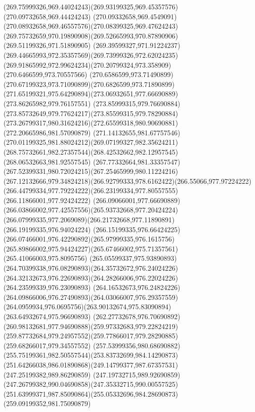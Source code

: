 {    \curveto(269.75999326,969.44024243)(269.93199325,969.45357576)(270.09732658,969.44424243)
    \curveto(270.09332658,969.4549091)(270.08932658,969.46557576)(270.08399325,969.47624243)
    \curveto(269.75732659,970.19890908)(269.52665993,970.87890906)(269.51199326,971.51890905)
    \curveto(269.39599327,971.91224237)(269.44665993,972.35357569)(269.73999326,972.62024235)
    \curveto(269.91865992,972.99624234)(270.20799324,973.358909)(270.6466599,973.70557566)
    \curveto(270.6586599,973.71490899)(270.67199323,973.71090899)(270.6826599,973.71890899)
    \curveto(271.65199321,975.64290894)(273.06932651,977.66690889)(273.86265982,979.76157551)
    \curveto(273.85999315,979.76690884)(273.85732649,979.77624217)(273.85599315,979.78290884)
    \curveto(273.26799317,980.31624216)(272.65599318,980.90690881)(272.20665986,981.57090879)
    \curveto(271.14132655,981.67757546)(270.01199325,981.88024212)(269.07199327,982.35624211)
    \curveto(268.75732661,982.27357544)(268.42532662,982.12957545)(268.06532663,981.92557545)
    \curveto(267.77332664,981.33357547)(267.52399331,980.72024215)(267.25465999,980.11224216)
    \curveto(267.12132666,979.34824218)(266.92799333,978.6162422)(266.55066,977.97224222)
    \curveto(266.44799334,977.79224222)(266.23199334,977.80557555)(266.11866001,977.92424222)
    \curveto(266.09066001,977.66690889)(266.03866002,977.42557556)(265.93732668,977.20424224)
    \curveto(266.07999335,977.2069089)(266.21732668,977.11890891)(266.19199335,976.94024224)
    \curveto(266.15199335,976.66424225)(266.07466001,976.42290892)(265.97999335,976.1615756)
    \curveto(265.89866002,975.94424227)(265.67466002,975.71357561)(265.41066003,975.8095756)
    \curveto(265.05599337,975.93890893)(264.70399338,976.08290893)(264.35732672,976.24024226)
    \curveto(264.32132673,976.22690893)(264.28266006,976.22024226)(264.23599339,976.23090893)
    \curveto(264.16532673,976.24824226)(264.09866006,976.27490893)(264.03066007,976.29357559)
    \curveto(264.0959934,976.0695756)(263.90132674,975.83090894)(263.64932674,975.96690893)
    \curveto(262.27732678,976.70690892)(260.98132681,977.94690888)(259.97332683,979.22824219)
    \curveto(259.87732684,979.24957552)(259.77866017,979.28290885)(259.68266017,979.34557552)
    \curveto(257.53999356,980.68690882)(255.75199361,982.50557544)(253.83732699,984.14290873)
    \curveto(251.64266038,986.01890868)(249.14799377,987.67357531)(247.25199382,989.86290859)
    \curveto(247.19732715,989.92690859)(247.26799382,990.04690858)(247.35332715,990.00557525)
    \curveto(251.63999371,987.85090864)(255.05332696,984.28690873)(259.09199352,981.75090879)
}

